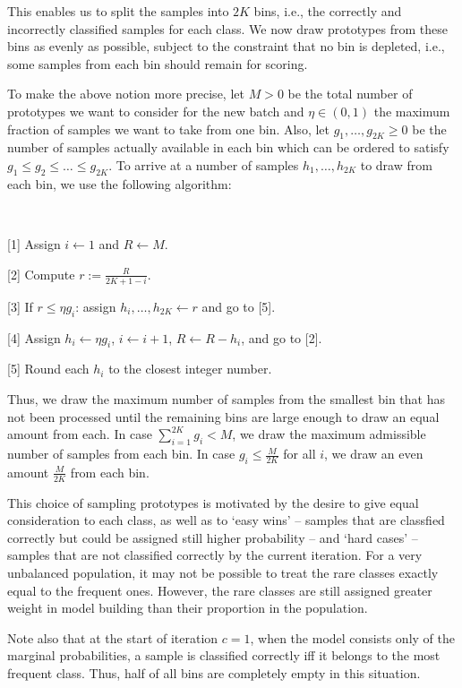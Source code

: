 This enables us to split the samples into $2K$ bins, i.e., the correctly and incorrectly classified samples for each class.
We now draw prototypes from these bins as evenly as possible, subject to the constraint that no bin is depleted, i.e., some samples from each bin should remain for scoring.\par
%
To make the above notion more precise, let $M>0$ be the total number of prototypes we want to consider for the new batch and $\eta\in(0,1)$ the  maximum fraction of samples we want to take from one bin.
Also, let $g_1,\dots, g_{2K}\geq0$ be the number of samples actually available in each bin which can be ordered to satisfy $g_1\leq g_2\leq\dots\leq g_{2K}$.
To arrive at a number of samples $h_1,\dots,h_{2K}$ to draw from each bin, we use the following algorithm:
%
\begin{samepage}
\begin{algorithm}~
\label{alg_bins}
%
\begin{description}
\item{[1]} Assign $i\leftarrow1$ and $R\leftarrow M$.
%
\item{[2]} Compute $r:=\frac{R}{2K+1-i}$.
%
\item{[3]} If $r\leq\eta g_i$: assign $h_i,\dots,h_{2K}\leftarrow r$ and go to [5].
%
\item{[4]} Assign $h_i\leftarrow\eta g_i$, $i\leftarrow i+1$, $R\leftarrow R-h_i$, and go to [2].
%
\item{[5]} Round each $h_i$ to the closest integer number.
\end{description}
\end{algorithm}
\end{samepage}
%
Thus, we draw the maximum number of samples from the smallest bin that has not been processed until the remaining bins are large enough to draw an equal amount from each.
In case $\sum_{i=1}^{2K}g_i<M$,  we draw the maximum admissible number of samples from each bin.
In case $g_i\leq\frac{M}{2K}$ for all $i$, we draw an even amount $\frac{M}{2K}$ from each bin.\par
%
\begin{remark}
This choice of sampling prototypes is motivated by the desire to give equal consideration to each class, as well as to `easy wins' -- samples that are classfied correctly but could be assigned still higher probability -- and `hard cases' -- samples that are not classified correctly by the current iteration.
For a very unbalanced population, it may not be possible to treat the rare classes exactly equal to the frequent ones.
However, the rare classes are still assigned greater weight in model building than their proportion in the population.\par
%
Note also that at the start of iteration $c=1$, when the model consists only of the marginal probabilities, a sample is classified correctly iff it belongs to the most frequent class.
Thus, half of all bins are completely empty in this situation.
\end{remark}
